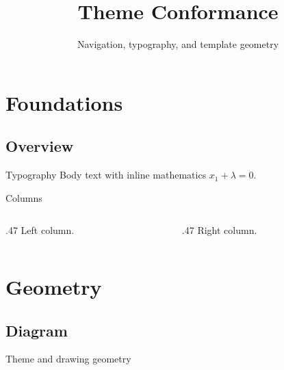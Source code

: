 \documentclass[aspectratio=169]{beamer}
\title{Theme Conformance}
\subtitle{Navigation, typography, and template geometry}
\author{}
\institute{}
\date{}
\begin{document}
\section{Foundations}
\subsection{Overview}

\begin{frame}{Typography}
  Body text with inline mathematics $x_1+\lambda=0$.
\end{frame}

\begin{frame}{Columns}
  \begin{columns}[T,totalwidth=\textwidth]
    \begin{column}{.47\textwidth}
      Left column.
    \end{column}
    \begin{column}{.47\textwidth}
      Right column.
    \end{column}
  \end{columns}
\end{frame}

\section{Geometry}
\subsection{Diagram}

\begin{frame}[t]{Theme and drawing geometry}
  \begin{center}
  \end{center}
\end{frame}
\end{document}
